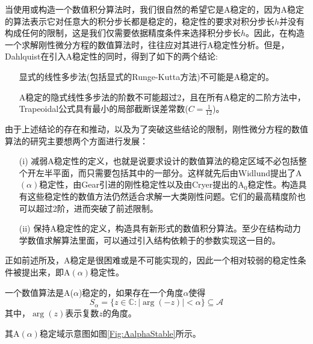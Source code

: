 当使用或构造一个数值积分算法时，我们很自然的希望它是A稳定的，因为A稳定的算法表示它对任意大的积分步长都是稳定的，稳定性的要求对积分步长$h$并没有构成任何的限制，这是我们仅需要依据精度条件来选择积分步长$h$。因此，在构造一个求解刚性微分方程的数值算法时，往往应对其进行A稳定性分析。但是，Dahlquist在引入A稳定性的同时，得到了如下的两个结论\cite{Dahlquist1963,Wanner2006,袁新鼎1987,ErnstHairer1996,book:dover}:
\begin{itemize}
\item[\ddag] 显式的线性多步法(包括显式的Runge-Kutta方法)不可能是A稳定的。
\item[\ddag] A稳定的隐式线性多步法的阶数不可能超过2，且在所有A稳定的二阶方法中，Trapeoidal公式具有最小的局部截断误差常数($C=\frac{1}{12}$)。
\end{itemize}
由于上述结论的存在和推动，以及为了突破这些结论的限制，刚性微分方程的数值算法的研究主要想两个方面进行发展：
\begin{itemize}
\item[(i)] 减弱A稳定性的定义，也就是说要求设计的数值算法的稳定区域不必包括整个开左半平面，而只需要包括其中的一部分。这样就先后由Widlund提出了A$(\alpha)$稳定性\cite{Widlund1967}，由Gear引进的刚性稳定性\cite{Gear1971a}以及由Cryer提出的$\text{A}_0$稳定性\cite{Cryer1973}。构造具有这些稳定性的数值方法仍然适合求解一大类刚性问题。它们的最高精度阶也可以超过2阶，进而突破了前述限制。
\item[(ii)] 保持A稳定性的定义，构造具有新形式的数值积分算法。至少在结构动力学数值求解算法里面，可以通过引入结构依赖于的参数实现这一目的。
\end{itemize}

正如前述所及，A稳定是很困难或是不可能实现的，因此一个相对较弱的稳定性条件被提出来，即A$(\alpha)$稳定性。
\begin{definition}
一个数值算法是A($\alpha$)稳定的\cite{Butcher2008,李寿佛2010,Widlund1967}，如果存在一个角度$\alpha$使得
\begin{equation}
S_\alpha=\{z\in\mathbb{C}:|\arg(-z)|<\alpha\}\subseteq\mathcal{A}
\end{equation}
其中，$\arg(z)$表示复数$z$的角度。
\end{definition}
其A$(\alpha)$稳定域示意图如图\ref{Fig:AalphaStable}所示。
\begin{figure}[htpb]
\centering
{}
\end{figure}

